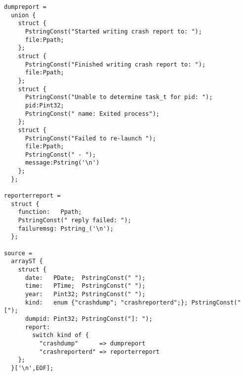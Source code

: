 \begin{figure*}
\begin{verbatim}
dumpreport =
  union {
    struct {
      PstringConst("Started writing crash report to: "); 
      file:Ppath;
    };
    struct {
      PstringConst("Finished writing crash report to: "); 
      file:Ppath;
    };
    struct {
      PstringConst("Unable to determine task_t for pid: "); 
      pid:Pint32; 
      PstringConst(" name: Exited process");
    };
    struct {
      PstringConst("Failed to re-launch "); 
      file:Ppath; 
      PstringConst(" - "); 
      message:Pstring('\n')
    };
  };

reporterreport =
  struct {
    function:   Ppath; 
    PstringConst(" reply failed: ");
    failuremsg: Pstring_('\n'); 
  };

source =
  arrayST {
    struct {
      date:   PDate;  PstringConst(" ");
      time:   PTime;  PstringConst(" ");
      year:   Pint32; PstringConst(" ");
      kind:   enum {"crashdump"; "crashreporterd";}; PstringConst("[");
      dumpid: Pint32; PstringConst("]: ");
      report: 
        switch kind of {
          "crashdump"      => dumpreport
          "crashreporterd" => reporterreport
    };
  }['\n',EOF];
\end{verbatim}

\caption{Hand-written \ir{} Crashreporter description.  
  Note: needs to be checked for correctness.  This was written by hand by Dave
  using the syntax of the paper, guided by the pads golden description, but deviating
  slightly by nesting instead of expanding definitions and altering base types to fit the
  base types available in the IR.  I also replaced Peor with 'backslash-n'...
can't to produce a backslash in tex.}
\label{fig:crashreporter:ir}
\end{figure*}
